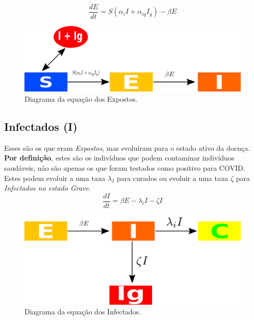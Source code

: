 \documentclass[12pt,letterpaper]{article}
\begin{document}
\begin{equation}
	\frac{dE}{dt}= S(\alpha_i I +\alpha_{ig}I_g) - \beta E
\end{equation}
\begin{figure}[!h]
	\centering
	\includegraphics[scale=0.4]{covidE}
	\caption{Diagrama da equação dos Expostos.}
	\label{fig:universe}
\end{figure}

\subsection{Infectados (I)}
Esses são os que eram \textit{Expostos}, mas evoluíram para o estado ativo da doença. \textbf{Por definição}, estes são os indivíduos que podem contaminar indivíduos saudáveis, não são apenas os que foram testados como positivo para COVID. Estes podem evoluir a uma taxa $\lambda_I$ para curados ou evoluir a uma taxa $\zeta$ para \textit{Infectados no estado Grave}.
\begin{equation}
	\frac{dI}{dt}= \beta E -\lambda_i I - \zeta I
\end{equation}
\begin{figure}[!h]
	\centering
	\includegraphics[scale=0.4]{covidI}
	\caption{Diagrama da equação dos Infectados.}
	\label{fig:universe}
\end{figure}
\end{document}
